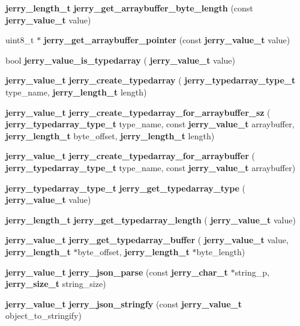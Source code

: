 \begin{DoxyCompactItemize}
\item 
\mbox{\label{group___core_gae5e853db95833a424d722cb88543b12d}} 
\textbf{ jerry\+\_\+length\+\_\+t} {\bfseries jerry\+\_\+get\+\_\+arraybuffer\+\_\+byte\+\_\+length} (const \textbf{ jerry\+\_\+value\+\_\+t} value)
\item 
\mbox{\label{group___core_gac2371b484199786e586ba279e717410e}} 
uint8\+\_\+t $\ast$ {\bfseries jerry\+\_\+get\+\_\+arraybuffer\+\_\+pointer} (const \textbf{ jerry\+\_\+value\+\_\+t} value)
\item 
\mbox{\label{group___core_gaaafdb9fadee4159801c783a4eac80ce2}} 
bool {\bfseries jerry\+\_\+value\+\_\+is\+\_\+typedarray} (\textbf{ jerry\+\_\+value\+\_\+t} value)
\item 
\mbox{\label{group___core_ga34cbcee40a5f70047ac1cb5921811db7}} 
\textbf{ jerry\+\_\+value\+\_\+t} {\bfseries jerry\+\_\+create\+\_\+typedarray} (\textbf{ jerry\+\_\+typedarray\+\_\+type\+\_\+t} type\+\_\+name, \textbf{ jerry\+\_\+length\+\_\+t} length)
\item 
\mbox{\label{group___core_ga2e586fd4af7c2b21930c3e8be56b2e1d}} 
\textbf{ jerry\+\_\+value\+\_\+t} {\bfseries jerry\+\_\+create\+\_\+typedarray\+\_\+for\+\_\+arraybuffer\+\_\+sz} (\textbf{ jerry\+\_\+typedarray\+\_\+type\+\_\+t} type\+\_\+name, const \textbf{ jerry\+\_\+value\+\_\+t} arraybuffer, \textbf{ jerry\+\_\+length\+\_\+t} byte\+\_\+offset, \textbf{ jerry\+\_\+length\+\_\+t} length)
\item 
\mbox{\label{group___core_ga8a528168142f2100a326d4a4f194b95c}} 
\textbf{ jerry\+\_\+value\+\_\+t} {\bfseries jerry\+\_\+create\+\_\+typedarray\+\_\+for\+\_\+arraybuffer} (\textbf{ jerry\+\_\+typedarray\+\_\+type\+\_\+t} type\+\_\+name, const \textbf{ jerry\+\_\+value\+\_\+t} arraybuffer)
\item 
\mbox{\label{group___core_gaed79772de0500d07a5affb01bb025baf}} 
\textbf{ jerry\+\_\+typedarray\+\_\+type\+\_\+t} {\bfseries jerry\+\_\+get\+\_\+typedarray\+\_\+type} (\textbf{ jerry\+\_\+value\+\_\+t} value)
\item 
\mbox{\label{group___core_ga3d46db7a28443ae95bb3489260015794}} 
\textbf{ jerry\+\_\+length\+\_\+t} {\bfseries jerry\+\_\+get\+\_\+typedarray\+\_\+length} (\textbf{ jerry\+\_\+value\+\_\+t} value)
\item 
\mbox{\label{group___core_gaa5a3b22fd85f648412342bc020e5bb33}} 
\textbf{ jerry\+\_\+value\+\_\+t} {\bfseries jerry\+\_\+get\+\_\+typedarray\+\_\+buffer} (\textbf{ jerry\+\_\+value\+\_\+t} value, \textbf{ jerry\+\_\+length\+\_\+t} $\ast$byte\+\_\+offset, \textbf{ jerry\+\_\+length\+\_\+t} $\ast$byte\+\_\+length)
\item 
\mbox{\label{group___core_ga8665d88e436223bec2782ca20fb4c665}} 
\textbf{ jerry\+\_\+value\+\_\+t} {\bfseries jerry\+\_\+json\+\_\+parse} (const \textbf{ jerry\+\_\+char\+\_\+t} $\ast$string\+\_\+p, \textbf{ jerry\+\_\+size\+\_\+t} string\+\_\+size)
\item 
\mbox{\label{group___core_gae3756276b22e0344222b7ee6ae459817}} 
\textbf{ jerry\+\_\+value\+\_\+t} {\bfseries jerry\+\_\+json\+\_\+stringfy} (const \textbf{ jerry\+\_\+value\+\_\+t} object\+\_\+to\+\_\+stringify)
\end{DoxyCompactItemize}


